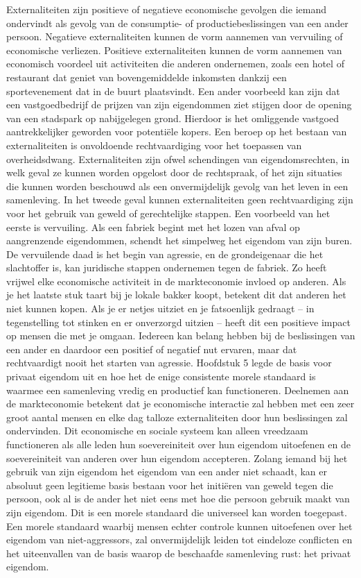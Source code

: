 Externaliteiten zijn positieve of negatieve economische gevolgen die iemand ondervindt als gevolg van de consumptie- of productiebeslissingen van een ander persoon. Negatieve externaliteiten kunnen de vorm aannemen van vervuiling of economische verliezen. Positieve externaliteiten kunnen de vorm aannemen van economisch voordeel uit activiteiten die anderen ondernemen, zoals een hotel of restaurant dat geniet van bovengemiddelde inkomsten dankzij een sportevenement dat in de buurt plaatsvindt. Een ander voorbeeld kan zijn dat een vastgoedbedrijf de prijzen van zijn eigendommen ziet stijgen door de opening van een stadspark op nabijgelegen grond. Hierdoor is het omliggende vastgoed aantrekkelijker geworden voor potentiële kopers. Een beroep op het bestaan van externaliteiten is onvoldoende rechtvaardiging voor het toepassen van overheidsdwang. Externaliteiten zijn ofwel schendingen van eigendomsrechten, in welk geval ze kunnen worden opgelost door de rechtspraak, of het zijn situaties die kunnen worden beschouwd als een onvermijdelijk gevolg van het leven in een samenleving. In het tweede geval kunnen externaliteiten geen rechtvaardiging zijn voor het gebruik van geweld of gerechtelijke stappen. Een voorbeeld van het eerste is vervuiling. Als een fabriek begint met het lozen van afval op aangrenzende eigendommen, schendt het simpelweg het eigendom van zijn buren. De vervuilende daad is het begin van agressie, en de grondeigenaar die het slachtoffer is, kan juridische stappen ondernemen tegen de fabriek. Zo heeft vrijwel elke economische activiteit in de markteconomie invloed op anderen. Als je het laatste stuk taart bij je lokale bakker koopt, betekent dit dat anderen het niet kunnen kopen. Als je er netjes uitziet en je fatsoenlijk gedraagt -- in tegenstelling tot stinken en er onverzorgd uitzien -- heeft dit een positieve impact op mensen die met je omgaan. Iedereen kan belang hebben bij de beslissingen van een ander en daardoor een positief of negatief nut ervaren, maar dat rechtvaardigt nooit het starten van agressie.\autocite{187} Hoofdstuk 5 legde de basis voor privaat eigendom uit en hoe het de enige consistente morele standaard is waarmee een samenleving vredig en productief kan functioneren. Deelnemen aan de markteconomie betekent dat je economische interactie zal hebben met een zeer groot aantal mensen en elke dag talloze externaliteiten door hun beslissingen zal ondervinden. Dit economische en sociale systeem kan alleen vreedzaam functioneren als alle leden hun soevereiniteit over hun eigendom uitoefenen en de soevereiniteit van anderen over hun eigendom accepteren. Zolang iemand bij het gebruik van zijn eigendom het eigendom van een ander niet schaadt, kan er absoluut geen legitieme basis bestaan voor het initiëren van geweld tegen die persoon, ook al is de ander het niet eens met hoe die persoon gebruik maakt van zijn eigendom. Dit is een morele standaard die universeel kan worden toegepast. Een morele standaard waarbij mensen echter controle kunnen uitoefenen over het eigendom van niet-aggressors, zal onvermijdelijk leiden tot eindeloze conflicten en het uiteenvallen van de basis waarop de beschaafde samenleving rust: het privaat eigendom.

